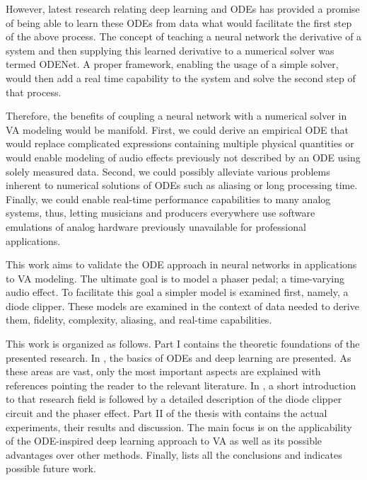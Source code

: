 However, latest research relating deep learning and \acp{ODE} has provided a promise of being able to learn these \acp{ODE} from data what would facilitate the first step of the above process. The concept of teaching a neural network the derivative of a system and then supplying this learned derivative to a numerical solver was termed ODENet. A proper framework, enabling the usage of a simple solver, would then add a real time capability to the system and solve the second step of that process.

Therefore, the benefits of coupling a neural network with a numerical solver in \ac{VA} modeling would be manifold. First, we could derive an empirical \ac{ODE} that would replace complicated expressions containing multiple physical quantities or would enable modeling of audio effects previously not described by an \ac{ODE} using solely measured data. Second, we could possibly alleviate various problems inherent to numerical solutions of \acp{ODE} such as aliasing or long processing time. Finally, we could enable real-time performance capabilities to many analog systems, thus, letting musicians and producers everywhere use software emulations of analog hardware previously unavailable for professional applications.

This work aims to validate the \ac{ODE} approach in neural networks in applications to \ac{VA} modeling. The ultimate goal is to model a phaser pedal; a time-varying audio effect. To facilitate this goal a simpler model is examined first, namely, a diode clipper. These models are examined in the context of data needed to derive them, fidelity, complexity, aliasing, and real-time capabilities.

This work is organized as follows. Part I contains the theoretic foundations of the presented research. In , the basics of \acp{ODE} and deep learning are presented. As these areas are vast, only the most important aspects are explained with references pointing the reader to the relevant literature. In , a short introduction to that research field is followed by a detailed description of the diode clipper circuit and the phaser effect. Part II of the thesis with  contains the actual experiments, their results and discussion. The main focus is on the applicability of the \ac{ODE}-inspired deep learning approach to \ac{VA} as well as its possible advantages over other methods. Finally,  lists all the conclusions and indicates possible future work.

